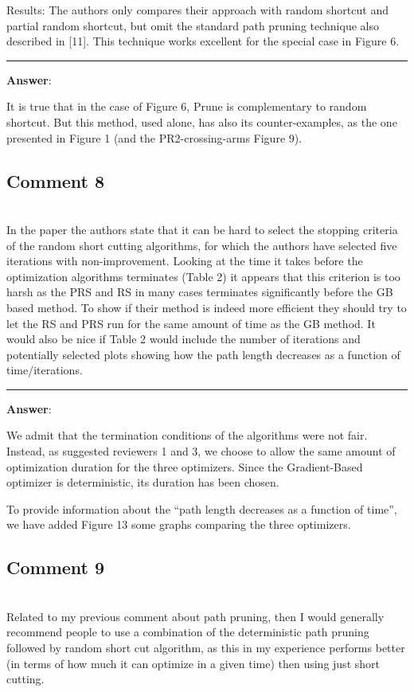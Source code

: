 \documentclass{scrartcl}
\begin{document}
Results:
The authors only compares their approach with random shortcut and partial random shortcut, but omit the standard path pruning technique also described in [11]. This technique works excellent for the special case in Figure 6. 

\rule{\linewidth}{.1pt}
\textbf{Answer}:

It is true that in the case of Figure 6, Prune is complementary to random shortcut. But this method, used alone, has also its counter-examples, as the one presented in Figure 1 (and the PR2-crossing-arms Figure 9).

\subsection{Comment 8}
\hrulefill\\

In the paper the authors state that it can be hard to select the stopping criteria of the random short cutting algorithms, for which the authors have selected five iterations with non-improvement. Looking at the time it takes before the optimization algorithms terminates (Table 2) it appears that this criterion is too harsh as the PRS and RS in many cases terminates significantly before the GB based method. To show if their method is indeed more efficient they should try to let the RS and PRS run for the same amount of time as the GB method. It would also be nice if Table 2 would include the number of iterations and potentially selected plots showing how the path length decreases as a function of time/iterations.

\rule{\linewidth}{.1pt}
\textbf{Answer}:

We admit that the termination conditions of the algorithms were not fair. Instead, as suggested reviewers 1 and 3, we choose to allow the same amount of optimization duration for the three optimizers. Since the Gradient-Based optimizer is deterministic, its duration has been chosen.

To provide information about the ``path length decreases as a function of time'', we have added Figure 13 some graphs comparing the three optimizers.

\subsection{Comment 9}
\hrulefill\\

Related to my previous comment about path pruning, then I would generally recommend people to use a combination of the deterministic path pruning followed by random short cut algorithm, as this in my experience performs better (in terms of how much it can optimize in a given time) then using just short cutting.
\end{document}
